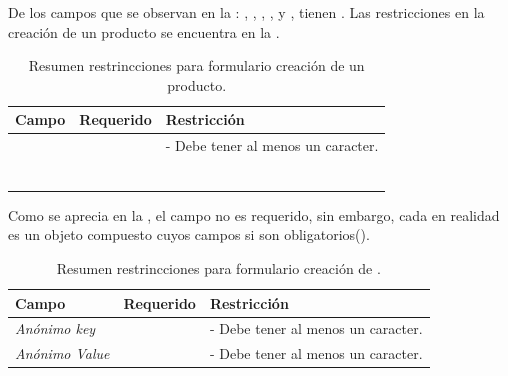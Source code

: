 		De los campos que se observan en la : \titleForm, \pageTitleForm, \vendorForm, \descriptionForm, \tagsForm y \detailsForm, tienen \feedbackReactivoDEF. Las restricciones en la creación de un producto se encuentra en la . 

		\begin{table}[H]
		    \centering
			\begin{tabular}{ |l|c||l| }
				\hline Campo & Requerido & Restricción \\ \hline
				\multirow{1}{*}{\titleForm} 			&  \multirow{1}{*}{\checkmark} & - Debe tener al menos un caracter. \\ \hline
				\multirow{1}{*}{\pageTitleForm} 	&  \multirow{1}{*}{} &  \\ \hline
				\multirow{1}{*}{\vendorForm}		&  \multirow{1}{*}{} &  \\ \hline
				\multirow{1}{*}{\optionsForm}		&  \multirow{1}{*}{\checkmark} &  \\ \hline
				\multirow{1}{*}{\descriptionForm}	&  \multirow{1}{*}{} &  \\ \hline
				\multirow{1}{*}{\multimediaForm}	&  \multirow{1}{*}{} &  \\ \hline
				\multirow{1}{*}{\tagsForm}			&  \multirow{1}{*}{} &  \\ \hline
			\end{tabular}
		 	\caption{Resumen restrincciones para formulario creación de un producto.}
		    \label{tab:solution:products:create:form:product:generic}
		\end{table}

		Como se aprecia en la , el campo \detailsForm no es requerido, sin embargo, cada \detailForm en realidad es un objeto compuesto cuyos campos si son obligatorios().

		\begin{table}[H]
		    \centering
			\begin{tabular}{ |l|c||l| }
				\hline Campo & Requerido & Restricción \\ \hline
				\multirow{1}{*}{\textit{Anónimo key}}	&  \multirow{1}{*}{\checkmark} & - Debe tener al menos un caracter. \\ \hline
				\multirow{1}{*}{\textit{Anónimo Value}}	&  \multirow{1}{*}{\checkmark} & - Debe tener al menos un caracter. \\ \hline
			\end{tabular}
		 	\caption{Resumen restrincciones para formulario creación de \detailsForm.}
		    \label{tab:solution:products:create:form:product:generic:details}
		\end{table}

